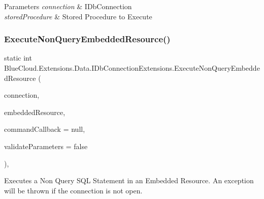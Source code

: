 \begin{DoxyParams}{Parameters}
{\em connection} & I\+Db\+Connection\\
\hline
{\em stored\+Procedure} & Stored Procedure to Execute\\
\hline
\end{DoxyParams}
\mbox{\label{class_blue_cloud_1_1_extensions_1_1_data_1_1_i_db_connection_extensions_af48b91dbba9d032dbd364a0ce48a7238}} 
\subsubsection{\texorpdfstring{Execute\+Non\+Query\+Embedded\+Resource()}{ExecuteNonQueryEmbeddedResource()}\hspace{0.1cm}{\footnotesize\ttfamily [1/2]}}
{\footnotesize\ttfamily static int Blue\+Cloud.\+Extensions.\+Data.\+I\+Db\+Connection\+Extensions.\+Execute\+Non\+Query\+Embedded\+Resource (\begin{DoxyParamCaption}\item[{this I\+Db\+Connection}]{connection,  }\item[{string}]{embedded\+Resource,  }\item[{Action$<$ I\+Db\+Command $>$}]{command\+Callback = {\ttfamily null},  }\item[{bool}]{validate\+Parameters = {\ttfamily false} }\end{DoxyParamCaption})\hspace{0.3cm}{\ttfamily [inline]}, {\ttfamily [static]}}



Executes a Non Query S\+QL Statement in an Embedded Resource. An exception will be thrown if the connection is not open. 


